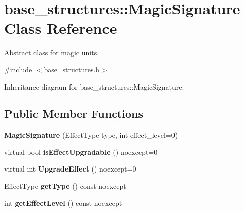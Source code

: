 \hypertarget{classbase__structures_1_1MagicSignature}{}\section{base\+\_\+structures\+:\+:Magic\+Signature Class Reference}
\label{classbase__structures_1_1MagicSignature}


Abstract class for magic units.  




{\ttfamily \#include $<$base\+\_\+structures.\+h$>$}



Inheritance diagram for base\+\_\+structures\+:\+:Magic\+Signature\+:
\subsection*{Public Member Functions}
\begin{DoxyCompactItemize}
\item 
\mbox{\label{classbase__structures_1_1MagicSignature_a24654b1ec780a324bfc10b19da57db79}} 
{\bfseries Magic\+Signature} (Effect\+Type type, int effect\+\_\+level=0)
\item 
\mbox{\label{classbase__structures_1_1MagicSignature_a347b92c90c31164d3d2f5a91c1ac0923}} 
virtual bool {\bfseries is\+Effect\+Upgradable} () noexcept=0
\item 
\mbox{\label{classbase__structures_1_1MagicSignature_a46648bbf4c565e069cd852c6fd5873a9}} 
virtual int {\bfseries Upgrade\+Effect} () noexcept=0
\item 
\mbox{\label{classbase__structures_1_1MagicSignature_a7cba04a43f864a11f56df973fb9faf34}} 
Effect\+Type {\bfseries get\+Type} () const noexcept
\item 
\mbox{\label{classbase__structures_1_1MagicSignature_ae7911ebdd5f6618628d7c4d7a8f8c8fb}} 
int {\bfseries get\+Effect\+Level} () const noexcept
\end{DoxyCompactItemize}

